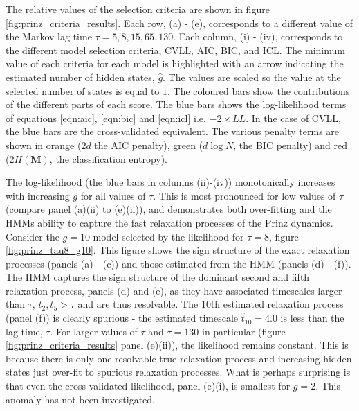 The relative values of the selection criteria are shown in figure \ref{fig:prinz_criteria_results}. Each row, (a) - (e), corresponds to a different value of the Markov lag time $\tau=5, 8, 15, 65, 130$. Each column, (i) - (iv), corresponds to the different model selection criteria, CVLL, AIC, BIC, and ICL. The minimum value of each criteria for each model is highlighted with an arrow indicating the estimated number of hidden states, $\hat{g}$. The values are scaled so the value at the selected number of states is equal to $1$.  The coloured bars show the contributions of the different parts of each score. The blue bars shows the log-likelihood terms of equations \ref{eqn:aic}, \ref{eqn:bic} and \ref{eqn:icl} i.e.  $-2\times LL$. In the case of CVLL, the blue bars are the  cross-validated equivalent. The various penalty terms are shown in orange ($2d$ the AIC penalty), green ($d\log{N}$, the BIC penalty) and red ($2H(\mathbf{M})$, the classification entropy).  

The log-likelihood (the blue bars in columns (ii)-(iv)) monotonically increases with increasing $g$ for all values of $\tau$. This is most pronounced for low values of $\tau$ (compare panel (a)(ii) to (e)(ii)), and demonstrates both over-fitting and the HMMs ability to capture the fast relaxation processes of the Prinz dynamics. Consider the $g=10$ model selected by the likelihood for $\tau=8$, figure \ref{fig:prinz_tau8_g10}. This figure shows the sign structure of the exact relaxation processes (panels (a) - (c)) and those estimated from the HMM (panels (d) - (f)).  The HMM captures the sign structure of the dominant second and fifth relaxation process, panels (d) and (e), as they have associated timescales larger than $\tau$, $t_{2}, t_{5} > \tau$ and are thus resolvable. The 10th estimated relaxation process (panel (f)) is clearly spurious - the estimated timescale $\hat{t}_{10} = 4.0$ is less than the lag time, $\tau$. For larger values of $\tau$ and $\tau= 130$ in particular (figure \ref{fig:prinz_criteria_results} panel (e)(ii)), the likelihood remains constant. This is because there is only one resolvable true relaxation process  and increasing hidden states just over-fit to spurious relaxation processes. What is perhaps surprising is that even the cross-validated likelihood, panel (e)(i), is smallest for $g=2$. This anomaly has not been investigated. 

